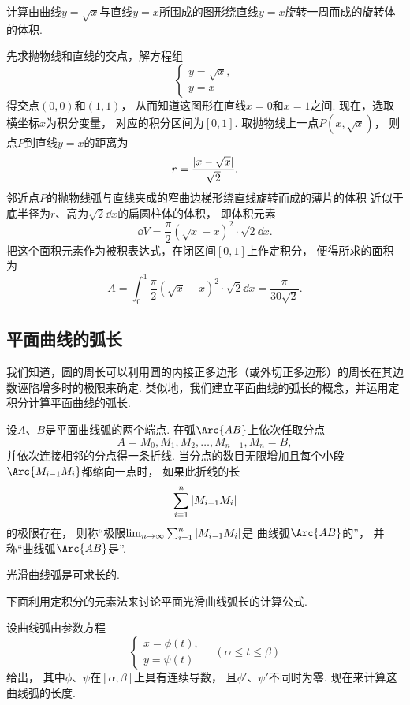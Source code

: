 \begin{example}
计算由曲线\(y=\sqrt{x}\)与直线\(y=x\)所围成的图形绕直线\(y=x\)旋转一周而成的旋转体的体积.
\begin{solution}
先求抛物线和直线的交点，解方程组\[
	\left\{ \begin{array}{l}
		y=\sqrt{x}, \\
		y=x
	\end{array} \right.
\]得交点\((0,0)\)和\((1,1)\)，
从而知道这图形在直线\(x=0\)和\(x=1\)之间.
现在，选取横坐标\(x\)为积分变量，
对应的积分区间为\([0,1]\).
取抛物线上一点\(P(x,\sqrt{x})\)，
则点\(P\)到直线\(y=x\)的距离为\[
	r = \frac{\abs{x-\sqrt{x}}}{\sqrt2}.
\]
邻近点\(P\)的抛物线弧与直线夹成的窄曲边梯形绕直线旋转而成的薄片的体积
近似于底半径为\(r\)、高为\(\sqrt2 \dd{x}\)的扁圆柱体的体积，
即体积元素\[
	\dd{V} = \frac\pi2 (\sqrt{x}-x)^2 \cdot \sqrt2 \dd{x}.
\]
把这个面积元素作为被积表达式，在闭区间\([0,1]\)上作定积分，
便得所求的面积为\[
	A = \int_0^1 \frac\pi2 (\sqrt{x}-x)^2 \cdot \sqrt2 \dd{x}
	= \frac\pi{30\sqrt2}.
\]
\end{solution}
\end{example}

\subsection{平面曲线的弧长}
我们知道，圆的周长可以利用圆的内接正多边形（或外切正多边形）的周长在其边数诬陷增多时的极限来确定.
类似地，我们建立平面曲线的弧长的概念，并运用定积分计算平面曲线的弧长.

设\(A\)、\(B\)是平面曲线弧的两个端点.
在弧\(\Arc{AB}\)上依次任取分点\[
	A=M_0,M_1,M_2,\dotsc,M_{n-1},M_n=B,
\]并依次连接相邻的分点得一条折线.
当分点的数目无限增加且每个小段\(\Arc{M_{i-1}M_i}\)都缩向一点时，
如果此折线的长\[
	\sum_{i=1}^n \abs{M_{i-1} M_i}
\]的极限存在，
则称“极限\(\lim_{n\to\infty} \sum_{i=1}^n \abs{M_{i-1} M_i}\)是
曲线弧\(\Arc{AB}\)的”，
并称“曲线弧\(\Arc{AB}\)是”.

\begin{theorem}
光滑曲线弧是可求长的.
\end{theorem}

下面利用定积分的元素法来讨论平面光滑曲线弧长的计算公式.

设曲线弧由参数方程\[
	\left\{ \begin{array}{l}
	x = \phi(t), \\
	y = \psi(t)
	\end{array} \right.
	\quad(\alpha \leq t \leq \beta)
\]给出，
其中\(\phi\)、\(\psi\)在\([\alpha,\beta]\)上具有连续导数，
且\(\phi'\)、\(\psi'\)不同时为零.
现在来计算这曲线弧的长度.

